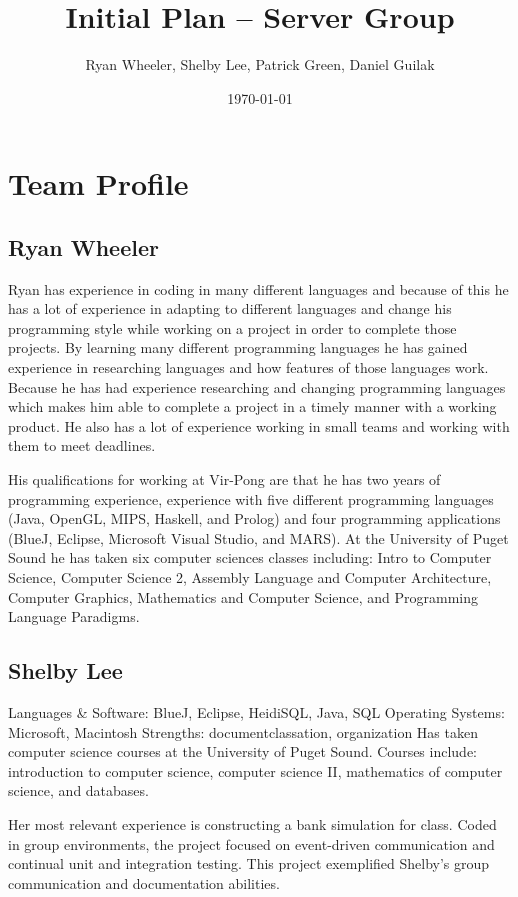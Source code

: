 \documentclass[letterpaper,12pt]{article}
\begin{document}
\title{Initial Plan -- Server Group}
\author{Ryan Wheeler, Shelby Lee, Patrick Green, Daniel Guilak}
\date{\today}
\maketitle

\tableofcontents

\section{Team Profile}
\subsection{Ryan Wheeler}
	Ryan has experience in coding in many different languages and because of this he has a lot of experience in adapting to different languages and change his programming style while working on a project in order to complete those projects.  By learning many different programming languages he has gained experience in researching languages and how features of those languages work.  Because he has had experience researching and changing programming languages which makes him able to complete a project in a timely manner with a working product.  He also has a lot of experience working in small teams and working with them to meet deadlines.

	His qualifications for working at Vir-Pong are that he has two years of programming experience, experience with five different programming languages (Java, OpenGL, MIPS, Haskell, and Prolog) and four programming applications (BlueJ, Eclipse, Microsoft Visual Studio, and MARS).  At the University of Puget Sound he has taken six computer sciences classes including: Intro to Computer Science, Computer Science 2, Assembly Language and Computer Architecture, Computer Graphics, Mathematics and Computer Science, and Programming Language Paradigms.
\subsection{Shelby Lee}
Languages \& Software: BlueJ, Eclipse, HeidiSQL, Java, SQL
Operating Systems: Microsoft, Macintosh
Strengths: documentclassation, organization
Has taken computer science courses at the University of Puget Sound. Courses include: introduction to computer science, computer science II, mathematics of computer science, and databases.

	Her most relevant experience is constructing a bank simulation for class. Coded in group environments, the project focused on event-driven communication and continual unit and integration testing. This project exemplified Shelby’s group communication and documentation abilities.
\end{document}
